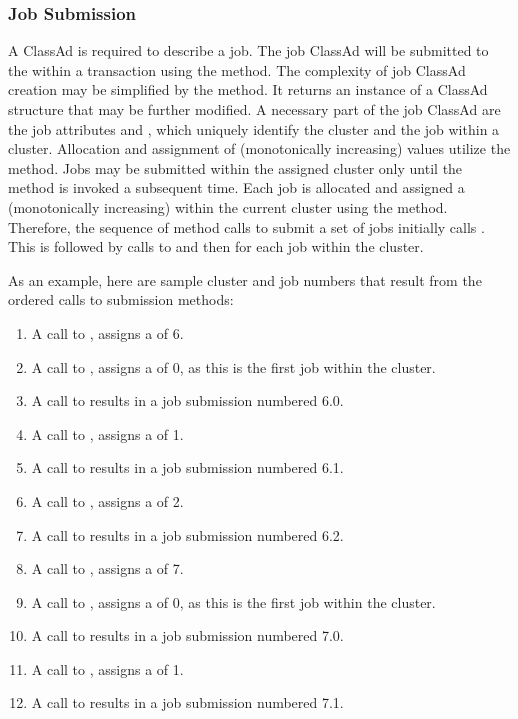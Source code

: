 \subsubsection{\label{WebService-Submission} Job Submission}

A ClassAd is required to describe a job.
The job ClassAd will be 
submitted to the  within a transaction
using the  method.
The complexity of job ClassAd creation may be simplified
by the  method.
It returns an instance of a ClassAd structure that may be
further modified.
A necessary part of the job ClassAd are the job attributes
 and , which uniquely identify
the cluster and the job within a cluster.
Allocation and assignment of (monotonically increasing)
 values utilize the  method.
Jobs may be submitted within the assigned cluster only until
the  method is invoked a subsequent time. 
Each job is allocated and assigned a (monotonically increasing)
 within the current cluster using the 
method.
Therefore, the sequence of method calls to submit a set of jobs
initially calls .
This is followed by calls to  and then 
for each job within the cluster.

As an example, here are sample cluster and job numbers that 
result from the ordered calls to submission methods:
\begin{enumerate}
 \item
 A call to , assigns a  of 6.
 \item
 A call to , assigns a  of 0, as
 this is the first job within the cluster.
 \item
 A call to  results in a job submission numbered 6.0.
 \item
 A call to , assigns a  of 1.
 \item
 A call to  results in a job submission numbered 6.1.
 \item
 A call to , assigns a  of 2.
 \item
 A call to  results in a job submission numbered 6.2.
 \item
 A call to , assigns a  of 7.
 \item
 A call to , assigns a  of 0, as
 this is the first job within the cluster.
 \item
 A call to  results in a job submission numbered 7.0.
 \item
 A call to , assigns a  of 1.
 \item
 A call to  results in a job submission numbered 7.1.
\end{enumerate}


